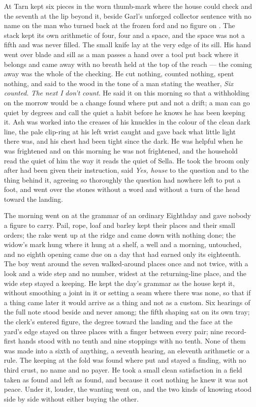 At  Tarn kept six pieces in the worn thumb-mark where the house could check and the seventh at the lip beyond it, beside Garl's unforged collector sentence with no name on the man who turned back at the frozen ford and no figure on . The stack kept its own arithmetic of four, four and a space, and the space was not a fifth and was never filled. The small knife lay at the very edge of its sill. His hand went over blade and sill as a man passes a hand over a tool put back where it belongs and came away with no breath held at the top of the reach --- the coming away was the whole of the checking. He cut nothing, counted nothing, spent nothing, and said to the wood in the tone of a man stating the weather, \emph{Six counted. The next I don't count}. He said it on this morning so that a withholding on the morrow would be a change found where put and not a drift; a man can go quiet by degrees and call the quiet a habit before he knows he has been keeping it. Ash was worked into the creases of his knuckles in the colour of the clean dark line, the pale clip-ring at his left wrist caught and gave back what little light there was, and his chest had been tight since the dark. He was helpful when he was frightened and on this morning he was not frightened, and the household read the quiet of him the way it reads the quiet of Sella. He took the broom only after  had been given their instruction, said \emph{Yes, house} to the question and to the thing behind it, agreeing so thoroughly the question had nowhere left to put a foot, and went over the stones without a word and without a turn of the head toward the landing.

The morning went on at the grammar of an ordinary Eighthday and gave nobody a figure to carry. Pail, rope, loaf and barley kept their places and their small orders; the rake went up at the ridge and came down with nothing done; the widow's mark hung where it hung at a shelf, a well and a morning, untouched, and no eighth opening came due on a day that had earned only its eighteenth. The boy went around the seven walked-around places once and not twice, with a look and a wide step and no number, widest at the returning-line place, and the wide step stayed a keeping. He kept the day's grammar as the house kept it, without smoothing a joint in it or setting a seam where there was none, so that if a thing came later it would arrive as a thing and not as a custom. Six hearings of the full note stood beside and never among; the fifth shaping sat on its own tray; the clerk's entered figure, the degree toward the landing and the face at the yard's edge stayed on three places with a finger between every pair; nine record-first hands stood with no tenth and nine stoppings with no tenth. None of them was made into a sixth of anything, a seventh hearing, an eleventh arithmetic or a rule. The keeping at the fold was found where put and stayed a finding, with no third crust, no name and no payer. He took a small clean satisfaction in a field taken as found and left as found, and because it cost nothing he knew it was not peace. Under it, louder, the wanting went on, and the two kinds of knowing stood side by side without either buying the other.

